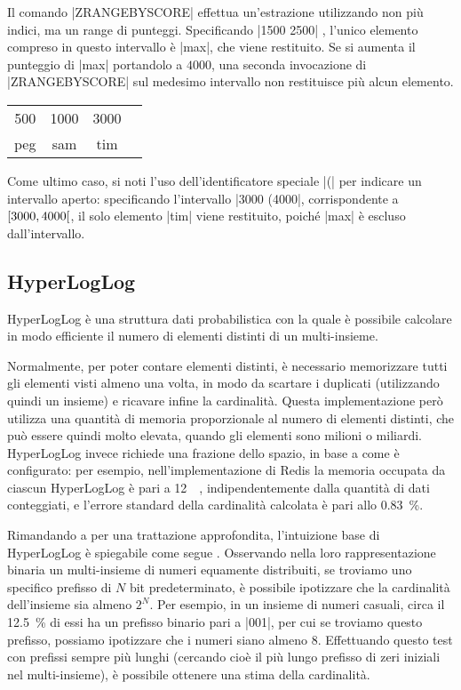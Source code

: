 Il comando \cverb|ZRANGEBYSCORE| effettua un'estrazione utilizzando non più indici, ma un range di
punteggi. Specificando \cverb|1500 2500| , l'unico elemento compreso in questo intervallo è
\cverb|max|, che viene restituito. Se si aumenta il punteggio di \cverb|max| portandolo a $4000$,
una seconda invocazione di \cverb|ZRANGEBYSCORE| sul medesimo intervallo non restituisce più
alcun elemento.

\begin{center}
	\begin{tabular}{|*{4}{c|}}
	  \hline
	  \num{500} & \num{1000} & \num{3000} & \cellcolor{blue!25}{\num{4000}} \\ 
	  peg & sam & tim & \cellcolor{blue!25}{max} \\ 
	  \hline
	\end{tabular}
\end{center}

Come ultimo caso, si noti l'uso dell'identificatore speciale \cverb|(| per indicare un intervallo
aperto: specificando l'intervallo \cverb|3000 (4000|, corrispondente a 
$\interval[open right]{3000}{4000}$, il solo elemento \cverb|tim| viene restituito, poiché \cverb|max|
è escluso dall'intervallo.

\subsection{HyperLogLog}

HyperLogLog \cite{hyperloglog} è una struttura dati probabilistica con la quale è possibile
calcolare in modo efficiente il numero di elementi distinti di un multi-insieme. 

Normalmente, per poter contare elementi distinti, è necessario memorizzare tutti gli elementi visti
almeno una volta, in modo da scartare i duplicati (utilizzando quindi un insieme) e ricavare infine
la cardinalità. Questa implementazione però utilizza una quantità di memoria proporzionale al numero
di elementi distinti, che può essere quindi molto elevata, quando gli elementi sono milioni o
miliardi. HyperLogLog invece richiede una frazione dello spazio, in base a come è configurato: per
esempio, nell'implementazione di Redis la memoria occupata da ciascun HyperLogLog è pari a
\SI{12}{\kibi\byte}, indipendentemente dalla quantità di dati conteggiati, e l'errore standard della
cardinalità calcolata è pari allo \SI{0.83}{\percent}.

Rimandando a \cite{hyperloglog} per una trattazione approfondita, l'intuizione base di HyperLogLog
è spiegabile come segue \cite{hyperloglog-explain}. Osservando nella loro rappresentazione binaria
un multi-insieme di numeri equamente distribuiti, se troviamo uno specifico prefisso di $N$ bit
predeterminato, è possibile ipotizzare che la cardinalità dell'insieme sia almeno $2^N$. Per
esempio, in un insieme di numeri casuali, circa il \SI{12.5}{\percent} di essi ha un prefisso
binario pari a \cverb|001|, per cui se troviamo questo prefisso, possiamo ipotizzare che i numeri
siano almeno \num{8}. Effettuando questo test con prefissi sempre più lunghi (cercando cioè il più
lungo prefisso di zeri iniziali nel multi-insieme), è possibile ottenere una stima della
cardinalità.

